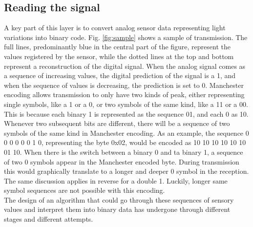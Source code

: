  \subsection{Reading the signal}
A key part of this layer is to convert analog sensor data representing light variations into binary code.
Fig. \ref{fig:sample} shows a sample of transmission.
The full lines, predominantly blue in the central part of the figure, represent the values registered by the sensor, while the dotted lines at the top and bottom represent a reconstruction of the digital signal.
When the analog signal comes as a sequence of increasing values, the digital prediction of the signal is  a 1, and when the sequence of values is decreasing, the prediction is set to 0.
Manchester encoding allows transmission to only have two kinds of peak, either representing single symbols, like a 1 or a 0, or two symbols of the same kind, like a 11 or a 00.
This is because each binary 1 is represented as the sequence 01, and each 0 as 10.
Whenever two subsequent bits are different, there will be a sequence of two symbols of the same kind in Manchester encoding.
As an example, the sequence 0 0 0 0 0 0 1 0, representing the byte 0x02, would be encoded as 10 10 10 10 10 10 01 10.
When there is the switch between a binary 0 and ta binary 1, a sequence of two 0 symbols appear in the Manchester encoded byte.
During transmission this would graphically translate to a longer and deeper 0 symbol in the reception.
The same discussion applies in reverse for a double 1.
Luckily, longer same symbol sequences are not possible with this encoding.\\
The design of an algorithm that could go through these sequences of sensory values and interpret them into binary data has undergone through different stages and different attempts.

